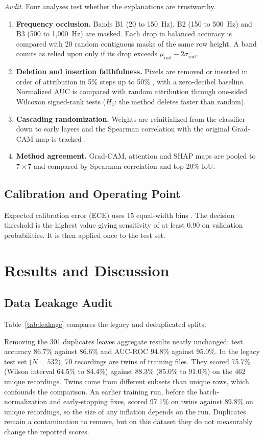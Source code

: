 \documentclass[conference]{IEEEtran}
\begin{document}
\textit{Audit.} Four analyses test whether the explanations are trustworthy.
\begin{enumerate}
\item \textbf{Frequency occlusion.} Bands B1 (20 to 150~Hz), B2 (150 to 500~Hz) and B3 (500 to 1,000~Hz) are masked. Each drop in balanced accuracy is compared with 20 random contiguous masks of the same row height. A band counts as relied upon only if its drop exceeds $\mu_{\text{rnd}} - 2\sigma_{\text{rnd}}$.
\item \textbf{Deletion and insertion faithfulness.} Pixels are removed or inserted in order of attribution in 5\% steps up to 50\% \cite{petsiuk}, with a zero-decibel baseline. Normalized AUC is compared with random attribution through one-sided Wilcoxon signed-rank tests ($H_1$: the method deletes faster than random).
\item \textbf{Cascading randomization.} Weights are reinitialized from the classifier down to early layers and the Spearman correlation with the original Grad-CAM map is tracked \cite{adebayo}.
\item \textbf{Method agreement.} Grad-CAM, attention and SHAP maps are pooled to $7\times7$ and compared by Spearman correlation and top-20\% IoU.
\end{enumerate}

\subsection{Calibration and Operating Point}
Expected calibration error (ECE) uses 15 equal-width bins \cite{guo}. The decision threshold is the highest value giving sensitivity of at least 0.90 on validation probabilities. It is then applied once to the test set.

\section{Results and Discussion}

\subsection{Data Leakage Audit}
\label{sec:leak}
Table~\ref{tab:leakage} compares the legacy and deduplicated splits.



Removing the 301 duplicates leaves aggregate results nearly unchanged: test accuracy 86.7\% against 86.6\% and AUC-ROC 94.8\% against 95.0\%. In the legacy test set ($N=532$), 70 recordings are twins of training files. They scored 75.7\% (Wilson interval 64.5\% to 84.4\%) against 88.3\% (85.0\% to 91.0\%) on the 462 unique recordings. Twins come from different subsets than unique rows, which confounds the comparison. An earlier training run, before the batch-normalization and early-stopping fixes, scored 97.1\% on twins against 89.8\% on unique recordings, so the size of any inflation depends on the run. Duplicates remain a contamination to remove, but on this dataset they do not measurably change the reported scores.
\end{document}
